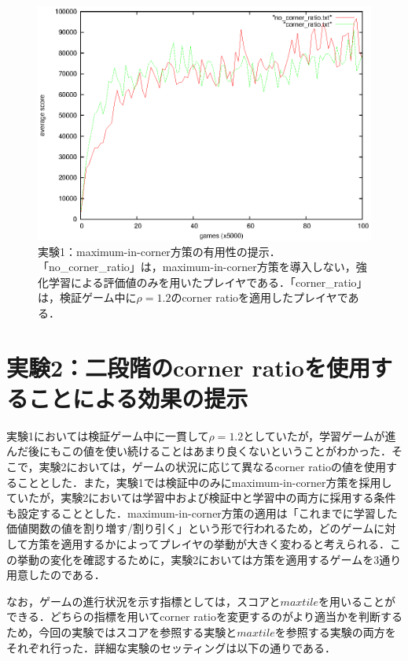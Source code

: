 \documentclass{suribt}
\begin{document}
\begin{figure}[t]
	\begin{center}
	\includegraphics[width=13cm]{figure_006.eps}
	\caption{実験1：maximum-in-corner方策の有用性の提示．「no\_corner\_ratio」は，maximum-in-corner方策を導入しない，強化学習による評価値のみを用いたプレイヤである．「corner\_ratio」は，検証ゲーム中に${\rho}=1.2$のcorner ratioを適用したプレイヤである．}
	\label{figure_006}
	\end{center}
\end{figure}

\section{実験2：二段階のcorner ratioを使用することによる効果の提示}
実験1においては検証ゲーム中に一貫して${\rho}=1.2$としていたが，学習ゲームが進んだ後にもこの値を使い続けることはあまり良くないということがわかった．そこで，実験2においては，ゲームの状況に応じて異なるcorner ratioの値を使用することとした．また，実験1では検証中のみにmaximum-in-corner方策を採用していたが，実験2においては学習中および検証中と学習中の両方に採用する条件も設定することとした．maximum-in-corner方策の適用は「これまでに学習した価値関数の値を割り増す/割り引く」という形で行われるため，どのゲームに対して方策を適用するかによってプレイヤの挙動が大きく変わると考えられる．この挙動の変化を確認するために，実験2においては方策を適用するゲームを3通り用意したのである．

なお，ゲームの進行状況を示す指標としては，スコアと$maxtile$を用いることができる．どちらの指標を用いてcorner ratioを変更するのがより適当かを判断するため，今回の実験ではスコアを参照する実験と$maxtile$を参照する実験の両方をそれぞれ行った．詳細な実験のセッティングは以下の通りである．
\end{document}
